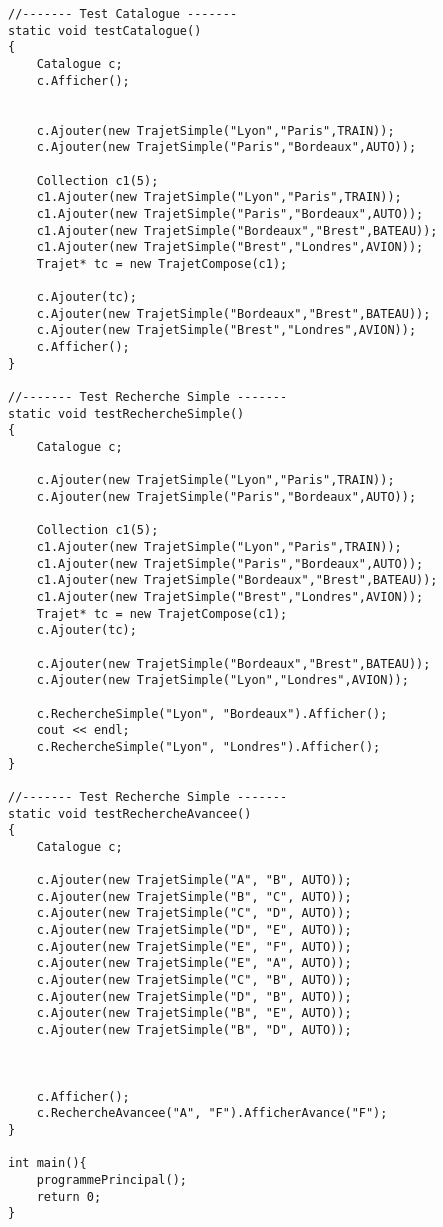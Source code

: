 \begin{verbatim}
//------- Test Catalogue -------
static void testCatalogue()
{
    Catalogue c;
    c.Afficher();
    
    
    c.Ajouter(new TrajetSimple("Lyon","Paris",TRAIN));
    c.Ajouter(new TrajetSimple("Paris","Bordeaux",AUTO));
    
    Collection c1(5);
    c1.Ajouter(new TrajetSimple("Lyon","Paris",TRAIN));
    c1.Ajouter(new TrajetSimple("Paris","Bordeaux",AUTO));
    c1.Ajouter(new TrajetSimple("Bordeaux","Brest",BATEAU));
    c1.Ajouter(new TrajetSimple("Brest","Londres",AVION));
    Trajet* tc = new TrajetCompose(c1);
    
    c.Ajouter(tc);
    c.Ajouter(new TrajetSimple("Bordeaux","Brest",BATEAU));
    c.Ajouter(new TrajetSimple("Brest","Londres",AVION));
    c.Afficher();
}

//------- Test Recherche Simple -------
static void testRechercheSimple()
{
    Catalogue c;
    
    c.Ajouter(new TrajetSimple("Lyon","Paris",TRAIN));
    c.Ajouter(new TrajetSimple("Paris","Bordeaux",AUTO));
    
    Collection c1(5);
    c1.Ajouter(new TrajetSimple("Lyon","Paris",TRAIN));
    c1.Ajouter(new TrajetSimple("Paris","Bordeaux",AUTO));
    c1.Ajouter(new TrajetSimple("Bordeaux","Brest",BATEAU));
    c1.Ajouter(new TrajetSimple("Brest","Londres",AVION));
    Trajet* tc = new TrajetCompose(c1);
    c.Ajouter(tc);
    
    c.Ajouter(new TrajetSimple("Bordeaux","Brest",BATEAU));
    c.Ajouter(new TrajetSimple("Lyon","Londres",AVION));
    
    c.RechercheSimple("Lyon", "Bordeaux").Afficher();
    cout << endl;
    c.RechercheSimple("Lyon", "Londres").Afficher();
}

//------- Test Recherche Simple -------
static void testRechercheAvancee()
{
    Catalogue c;
    
    c.Ajouter(new TrajetSimple("A", "B", AUTO));
    c.Ajouter(new TrajetSimple("B", "C", AUTO));
    c.Ajouter(new TrajetSimple("C", "D", AUTO));
    c.Ajouter(new TrajetSimple("D", "E", AUTO));
    c.Ajouter(new TrajetSimple("E", "F", AUTO));
    c.Ajouter(new TrajetSimple("E", "A", AUTO));
    c.Ajouter(new TrajetSimple("C", "B", AUTO));
    c.Ajouter(new TrajetSimple("D", "B", AUTO));
    c.Ajouter(new TrajetSimple("B", "E", AUTO));
    c.Ajouter(new TrajetSimple("B", "D", AUTO));
    
    
    
    c.Afficher();
    c.RechercheAvancee("A", "F").AfficherAvance("F");
}

int main(){
    programmePrincipal();
    return 0;
}

\end{verbatim}
